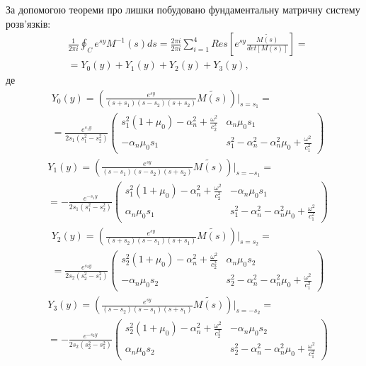 За допомогою теореми про лишки побудовано фундаментальну матричну систему розв'язків:
\begin{align*}
    &\frac{1}{2\pi i} \oint_C e^{sy} M^{-1}(s)ds = \frac{2 \pi i}{2 \pi i} \sum_{i=1}^{4} Res\left[ e^{sy} \frac{\widetilde{M(s)}}{det[M(s)]} \right] = \\
    & = Y_0(y) + Y_1(y) + Y_2(y) + Y_3(y),
\end{align*}
де
\begin{align}
    &Y_0(y) =  \left( \frac{e^{sy}}{(s+s_1)(s - s_2)(s + s_2)} \widetilde{M(s)} \right) \Big|_{s=s_1} = \nonumber \\
    &=\frac{e^{s_1 y}}{2s_1 (s_1^2 - s_2^2)} \begin{pmatrix}
        s_1^2 (1 + \mu_0) -\alpha_n^2 + \frac{\omega^2}{c_2^2} & \alpha_n \mu_0 s_1 \\
        -\alpha_n \mu_0 s_1 & s_1^2 - \alpha_n^2 - \alpha_n^2\mu_0 + \frac{\omega^2}{c_1^2}
    \end{pmatrix}
\end{align}
\begin{align}
    &Y_1(y) =  \left( \frac{e^{sy}}{(s-s_1)(s - s_2)(s + s_2)} \widetilde{M(s)} \right) \Big|_{s=-s_1} = \nonumber \\
    &=-\frac{e^{-s_1 y}}{2s_1 (s_1^2 - s_2^2)} \begin{pmatrix}
        s_1^2 (1 + \mu_0) -\alpha_n^2 + \frac{\omega^2}{c_2^2} & -\alpha_n \mu_0 s_1 \\
        \alpha_n \mu_0 s_1 & s_1^2 - \alpha_n^2 - \alpha_n^2\mu_0 + \frac{\omega^2}{c_1^2}
    \end{pmatrix}
\end{align}
\begin{align}
    &Y_2(y) =  \left( \frac{e^{sy}}{(s+s_2)(s - s_1)(s + s_1)} \widetilde{M(s)} \right) \Big|_{s=s_2} = \nonumber \\
    &=\frac{e^{s_2 y}}{2s_2 (s_2^2 - s_1^2)} \begin{pmatrix}
        s_2^2 (1 + \mu_0) -\alpha_n^2 + \frac{\omega^2}{c_2^2} & \alpha_n \mu_0 s_2 \\
        -\alpha_n \mu_0 s_2 & s_2^2 - \alpha_n^2 - \alpha_n^2\mu_0 + \frac{\omega^2}{c_1^2}
    \end{pmatrix}
\end{align}
\begin{align}
    &Y_3(y) =  \left( \frac{e^{sy}}{(s-s_2)(s - s_1)(s + s_1)} \widetilde{M(s)} \right) \Big|_{s=-s_2} = \nonumber \\
    &=-\frac{e^{-s_2 y}}{2s_2 (s_2^2 - s_1^2)} \begin{pmatrix}
        s_2^2 (1 + \mu_0) -\alpha_n^2 + \frac{\omega^2}{c_2^2} & -\alpha_n \mu_0 s_2 \\
        \alpha_n \mu_0 s_2 & s_2^2 - \alpha_n^2 - \alpha_n^2\mu_0 + \frac{\omega^2}{c_1^2}
    \end{pmatrix}
\end{align}

